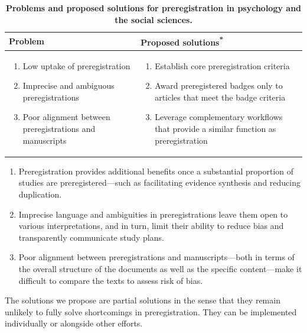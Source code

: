 \documentclass[authordate, meta]{jote-new-article}
\begin{document}
\begin{table}
  \begin{fullwidth}

    \caption[ashtash]{ \textbf{Problems and proposed solutions for preregistration in psychology and the social sciences. }}
    \begin{tabularx}{\textwidth}{@{} >{\arraybackslash\RaggedRight}X  >{\arraybackslash\RaggedRight}X @{}}
      \toprule
      \textbf{Problem} &
      \textbf{Proposed solutions}\textsuperscript{\textbf{*}}
      \\
      \midrule

      \begin{enumerate}
        \item Low uptake of preregistration
        \item Imprecise and ambiguous preregistrations
        \item Poor alignment between preregistrations and manuscripts
      \end{enumerate}
                       &

      {
          \renewcommand{\theenumi}{\Alph{enumi}}
          \begin{enumerate}

            \item  Establish core preregistration criteria
            \item      Award preregistered badges only to articles that meet the badge criteria
            \item Leverage complementary workflows that provide a similar function as preregistration
          \end{enumerate}}
      \\
      \bottomrule
    \end{tabularx}
    {\small \RaggedRight

    \begin{enumerate}
      \item Preregistration provides additional benefits once a substantial proportion of studies are preregistered—such as facilitating evidence synthesis and reducing duplication.
      \item Imprecise language and ambiguities in preregistrations leave them open to various interpretations, and in turn, limit their ability to reduce bias and transparently communicate study plans.
      \item Poor alignment between preregistrations and manuscripts—both in terms of the overall structure of the documents as well as the specific content—make it difficult to compare the texts to assess risk of bias.
    \end{enumerate}
    The solutions we propose are partial solutions in the sense that they remain unlikely to fully solve shortcomings in preregistration. They can be implemented individually or alongside other efforts.

}
\end{fullwidth}
\end{table}
\end{document}
